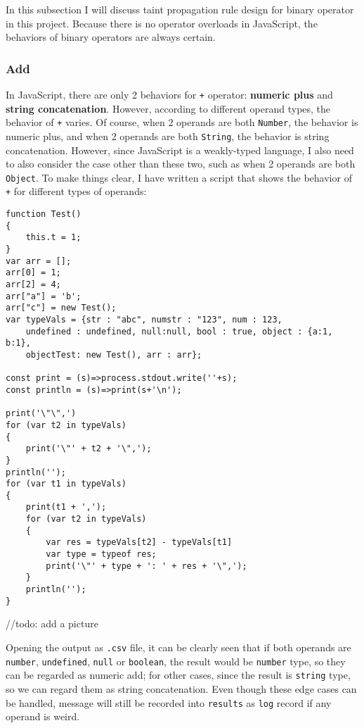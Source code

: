 In this subsection I will discuss taint propagation rule design for binary operator in this project. Because there is no operator overloads in JavaScript, the behaviors of binary operators are always certain.

\subsubsection{Add}

In JavaScript, there are only 2 behaviors for \texttt{+} operator: \textbf{numeric plus} and \textbf{string concatenation}. However, according to different operand types, the behavior of \texttt{+} varies. Of course, when 2 operands are both \texttt{Number}, the behavior is numeric plus, and when 2 operands are both \texttt{String}, the behavior is string concatenation. However, since JavaScript is a weakly-typed language, I also need to also consider the case other than these two, such as when 2 operands are both \texttt{Object}. To make things clear, I have written a script that shows the behavior of \texttt{+} for different types of operands:

\begin{verbatim}
function Test()
{
    this.t = 1;
}
var arr = [];
arr[0] = 1;
arr[2] = 4;
arr["a"] = 'b';
arr["c"] = new Test();
var typeVals = {str : "abc", numstr : "123", num : 123,
    undefined : undefined, null:null, bool : true, object : {a:1, b:1},
    objectTest: new Test(), arr : arr};

const print = (s)=>process.stdout.write(''+s);
const println = (s)=>print(s+'\n');

print('\"\",')
for (var t2 in typeVals)
{
    print('\"' + t2 + '\",');
}
println('');
for (var t1 in typeVals)
{
    print(t1 + ',');
    for (var t2 in typeVals)
    {
        var res = typeVals[t2] - typeVals[t1]
        var type = typeof res;
        print('\"' + type + ': ' + res + '\",');
    }
    println('');
}
\end{verbatim}

//todo: add a picture

Opening the output as \texttt{.csv} file, it can be clearly seen that if both operands are \texttt{number}, \texttt{undefined}, \texttt{null} or \texttt{boolean}, the result would be \texttt{number} type, so they can be regarded as numeric add; for other cases, since the result is \texttt{string} type, so we can regard them as string concatenation. Even though these edge cases can be handled, message will still be recorded into \texttt{results} as \texttt{log} record if any operand is weird.

